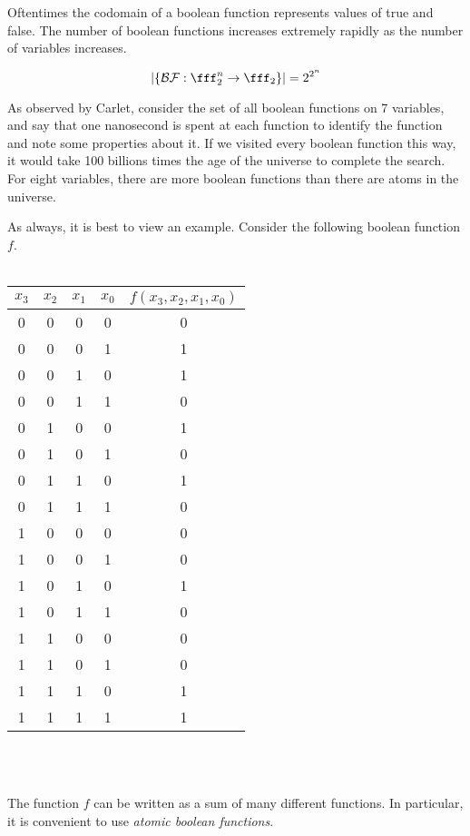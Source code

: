 \par Oftentimes the codomain of a boolean function represents values of true
and false. The number of boolean functions increases
extremely rapidly as the number of variables increases.

\begin{equation}
  \lvert\{\mathcal{BF}:\fff_2^n\rightarrow\fff_2\}\rvert = 2^{2^n}
\end{equation}

\par As observed by Carlet, consider the set of all boolean functions on 7 variables,
and say that one nanosecond is spent at each function to identify the function and
note some properties about it. If we visited every boolean function this way, it
would take 100 billions times the age of the universe to complete the search.
For eight variables, there are more boolean functions than there are atoms in the
universe.

\par As always, it is best to view an example. Consider the following boolean function
$f$.
\\
\\
\begin{tabular}{|c|c|c|c|c|}
  \hline
  $x_3$&$x_2$&$x_1$&$x_0$&$f(x_3,x_2,x_1,x_0)$\\
  \hline
  0&0&0&0&0\\
  0&0&0&1&1\\
  0&0&1&0&1\\
  0&0&1&1&0\\
  0&1&0&0&1\\
  0&1&0&1&0\\
  0&1&1&0&1\\
  0&1&1&1&0\\
  1&0&0&0&0\\
  1&0&0&1&0\\
  1&0&1&0&1\\
  1&0&1&1&0\\
  1&1&0&0&0\\
  1&1&0&1&0\\
  1&1&1&0&1\\
  1&1&1&1&1\\
  \hline
\end{tabular}
\\
\\
\par The function $f$ can be written as a sum of many different functions.
In particular, it is convenient to use {\em atomic boolean functions}.

